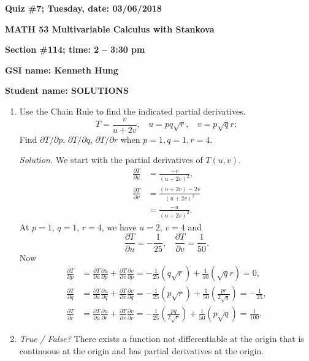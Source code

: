 \documentclass{article}
\begin{document}
{\bf Quiz \#7; Tuesday, date: 03/06/2018}

{\bf MATH 53 Multivariable Calculus with Stankova}

{\bf Section \#114; time: 2 -- 3:30 pm}

{\bf GSI name: Kenneth Hung}

{\bf Student name: SOLUTIONS}

\vspace*{0.25in}

\begin{enumerate}
\item Use the Chain Rule to find the indicated partial derivatives.
\[
T = \frac{v}{u + 2v}, ~~~~ u = pq \sqrt{r}, ~~~~ v = p \sqrt{q} r;
\]
Find $\partial T / \partial p$, $\partial T / \partial q$, $\partial T / \partial r$ when $p = 1, q = 1, r = 4$.

{\em Solution.} We start with the partial derivatives of $T(u, v)$.
\begin{align*}
\frac{\partial T}{\partial u} & = \frac{-v}{(u + 2v)^2}, \\
\frac{\partial T}{\partial v} & = \frac{(u + 2v) - 2v}{(u + 2v)^2} \\
& = \frac{-u}{(u + 2v)^2}.
\end{align*}
At $p = 1$, $q = 1$, $r = 4$, we have $u = 2$, $v = 4$ and
\[
\frac{\partial T}{\partial u} = -\frac{1}{25}, ~~~~ \frac{\partial T}{\partial v} = \frac{1}{50}.
\]
Now
\begin{align*}
\frac{\partial T}{\partial p} & = \frac{\partial T}{\partial u} \frac{\partial u}{\partial p} + \frac{\partial T}{\partial v} \frac{\partial v}{\partial p} = -\frac{1}{25} (q \sqrt{r}) + \frac{1}{50} (\sqrt{q} r) = 0, \\
\frac{\partial T}{\partial q} & = \frac{\partial T}{\partial u} \frac{\partial u}{\partial q} + \frac{\partial T}{\partial v} \frac{\partial v}{\partial q} = -\frac{1}{25} (p \sqrt{r}) + \frac{1}{50} \left(\frac{pr}{2\sqrt{q}}\right) = -\frac{1}{25}, \\
\frac{\partial T}{\partial r} & = \frac{\partial T}{\partial u} \frac{\partial u}{\partial r} + \frac{\partial T}{\partial v} \frac{\partial v}{\partial r} = -\frac{1}{25} \left(\frac{pq}{2 \sqrt{r}}\right) + \frac{1}{50} (p \sqrt{q}) = \frac{1}{100}.
\end{align*}

\item {\em True / False?} There exists a function not differentiable at the origin that is continuous at the origin and has partial derivatives at the origin.


\end{enumerate}
\end{document}

